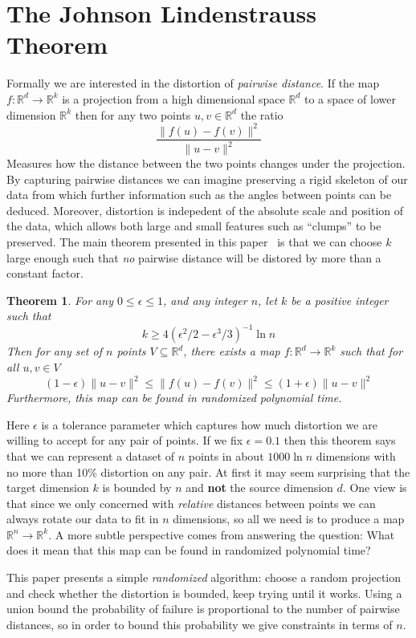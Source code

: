 \documentclass[11pt]{article}
\newcommand{\arr}{\rightarrow}
\newcommand{\R}{\mathbb{R}}
\newtheorem{Thm}{Theorem}
\begin{document}
\section{The Johnson Lindenstrauss Theorem}
Formally we are interested in the distortion of \textit{pairwise distance}. If
the map $f : \R^d \arr \R^k$ is a projection from a high dimensional space
$\R^d$ to a space of lower dimension $\R^k$ then for any two points $u, v \in
\R^d$ the ratio
\[ \frac{\| f(u) - f(v) \|^2}{\| u - v \|^2} \]
Measures how the distance between the two points changes under the projection.
By capturing pairwise distances we can imagine preserving a rigid skeleton of
our data from which further information such as the angles between points can be
deduced. Moreover, distortion is indepedent of the absolute scale and position
of the data, which allows both large and small features such as ``clumps'' to be
preserved. The main theorem presented in this paper~\cite{mainpaper} is that we
can choose $k$ large enough such that \textit{no} pairwise distance will be
distored by more than a constant factor.

\begin{Thm}
  For any $0 \leq \epsilon \leq 1$, and any integer $n$, let $k$ be a positive
  integer such that
  \[ 
    k \geq 4(\epsilon^2/2 - \epsilon^3/3)^{-1} \ln n 
  \]
  Then for any set of $n$ points $V \subseteq \R^d$, there exists a map
  $f:\R^d \arr \R^k$ such that for all $u, v \in V$
  \[
    (1-\epsilon)\|u - v\|^2 \leq \| f(u) - f(v) \|^2 \leq (1+\epsilon) \| u - v \|^2 
  \]
  Furthermore, this map can be found in randomized polynomial time.
\end{Thm}

Here $\epsilon$ is a tolerance parameter which captures how much distortion we are willing to accept for any pair of points. If we fix $\epsilon = 0.1$ then this theorem says that we can represent a dataset of $n$ points in about $1000 \ln n$ dimensions with no more than 10\% distortion on any pair. At first it may seem surprising that the target dimension $k$ is bounded by $n$ and \textbf{not} the source dimension $d$. One view is that since we only concerned with \textit{relative} distances between points we can always rotate our data to fit in $n$ dimensions, so all we need is to produce a map $\R^n \arr \R^k$. A more subtle perspective comes from answering the question: What does it mean that this map can be found in randomized polynomial time?

This paper presents a simple \textit{randomized} algorithm: choose a random projection and check whether the distortion is bounded, keep trying until it works. Using a union bound the probability of failure is proportional to the number of pairwise distances, so in order to bound this probability we give constraints in terms of $n$.
\end{document}
